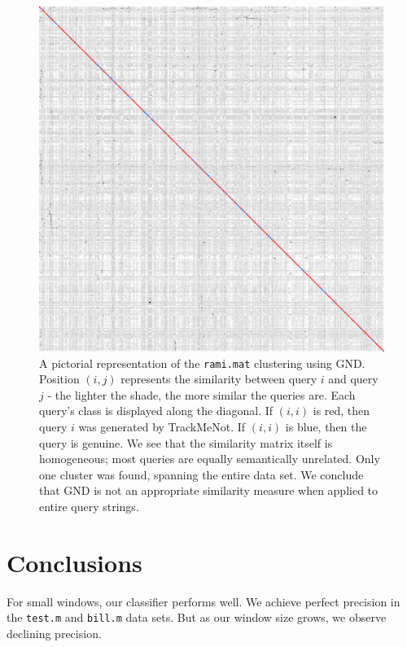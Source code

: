 \documentclass{llncs}
\begin{document}
\begin{multicols}{2}
  \begin{figure}[h]
    \centering
    \includegraphics[width=\linewidth]{ngd_rami_305.pdf}
    \caption{A pictorial representation of the \texttt{rami.mat}
      clustering using GND. Position $(i,j)$ represents the similarity
      between query $i$ and query $j$ - the lighter the shade, the
      more similar the queries are. Each query's class is displayed
      along the diagonal. If $(i,i)$ is red, then query $i$ was
      generated by TrackMeNot. If $(i,i)$ is blue, then the query is
      genuine. We see that the similarity matrix itself is
      homogeneous; most queries are equally semantically
      unrelated. Only one cluster was found, spanning the entire data
      set. We conclude that GND is not an appropriate similarity
      measure when applied to entire query strings.}
    \label{fig:rami.ngd}
  \end{figure}

\section{Conclusions}
\label{sec:conc}

For small windows, our classifier performs well. We achieve perfect
precision in the \texttt{test.m} and \texttt{bill.m} data sets. But as
our window size grows, we observe declining precision. 


\end{multicols}
\end{document}

